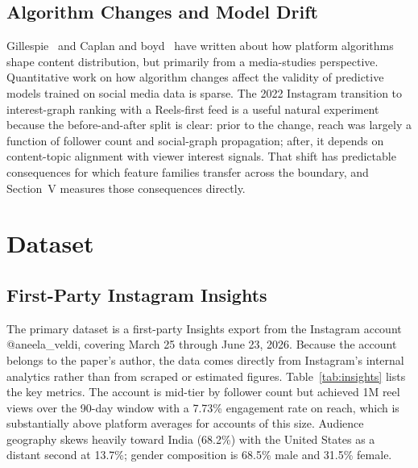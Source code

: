 \documentclass[conference]{IEEEtran}
\begin{document}
\subsection{Algorithm Changes and Model Drift}

Gillespie~\cite{gillespie2014} and Caplan and boyd~\cite{caplan2018} have
written about how platform algorithms shape content distribution, but
primarily from a media-studies perspective. Quantitative work on how algorithm
changes affect the validity of predictive models trained on social media data
is sparse. The 2022 Instagram transition to interest-graph ranking with a
Reels-first feed is a useful natural experiment because the before-and-after
split is clear: prior to the change, reach was largely a function of follower
count and social-graph propagation; after, it depends on content-topic
alignment with viewer interest signals. That shift has predictable consequences
for which feature families transfer across the boundary, and Section~V
measures those consequences directly.

\section{Dataset}

\subsection{First-Party Instagram Insights}

The primary dataset is a first-party Insights export from the Instagram
account @aneela\_veldi, covering March 25 through June 23, 2026. Because the
account belongs to the paper's author, the data comes directly from
Instagram's internal analytics rather than from scraped or estimated figures.
Table~\ref{tab:insights} lists the key metrics. The account is mid-tier by
follower count but achieved 1M reel views over the 90-day window with a
7.73\% engagement rate on reach, which is substantially above platform
averages for accounts of this size. Audience geography skews heavily toward
India (68.2\%) with the United States as a distant second at 13.7\%;
gender composition is 68.5\% male and 31.5\% female.
\end{document}
